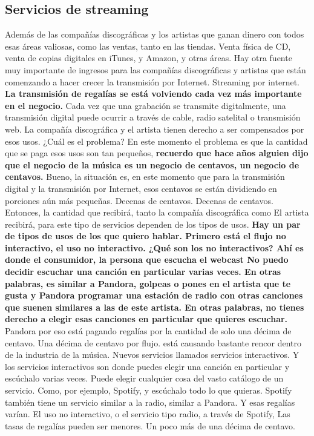 \documentclass[10pt]{book}
\begin{document}
\subsection{Servicios de streaming}
Además de las compañías discográficas y los artistas que ganan dinero con todos esas áreas valiosas, como las ventas, tanto en las tiendas. Venta física de CD, venta de copias digitales en iTunes, y Amazon, y otras áreas. Hay otra fuente muy importante de ingresos para las compañías discográficas y artistas que están comenzando a hacer crecer la transmisión por Internet. Streaming por internet. \textbf{La transmisión de regalías se está volviendo cada vez más importante en el negocio.} Cada vez que una grabación se transmite digitalmente, una transmisión digital puede ocurrir a través de cable, radio satelital o transmisión web. La compañía discográfica y el artista tienen derecho a ser compensados por esos usos. ¿Cuál es el problema? En este momento el problema es que la cantidad que se paga esos usos son tan pequeños, \textbf{recuerdo que hace años alguien dijo que el negocio de la música es un negocio de centavos, un negocio de centavos.} Bueno, la situación es, en este momento que para la transmisión digital y la transmisión por Internet, esos centavos se están dividiendo en porciones aún más pequeñas. Decenas de centavos. Decenas de centavos. Entonces, la cantidad que recibirá, tanto la compañía discográfica como El artista recibirá, para este tipo de servicios dependen de los tipos de usos. \textbf{Hay un par de tipos de usos de los que quiero hablar. Primero está el flujo no interactivo, el uso no interactivo. ¿Qué son los no interactivos? Ahí es donde el consumidor, la persona que escucha el webcast No puedo decidir escuchar una canción en particular varias veces. En otras palabras, es similar a Pandora, golpeas o pones en el artista que te gusta y Pandora programar una estación de radio con otras canciones que suenen similares a las de este artista. En otras palabras, no tienes derecho a elegir esas canciones en particular que quieres escuchar.} Pandora por eso está pagando regalías por la cantidad de solo una décima de centavo. Una décima de centavo por flujo. está causando bastante rencor dentro de la industria de la música. Nuevos servicios llamados servicios interactivos. Y los servicios interactivos son donde puedes elegir una canción en particular y escúchalo varias veces. Puede elegir cualquier cosa del vasto catálogo de un servicio. Como, por ejemplo, Spotify, y escúchalo todo lo que quieras. Spotify también tiene un servicio similar a la radio, similar a Pandora. Y esas regalías varían. El uso no interactivo, o el servicio tipo radio, a través de Spotify, Las tasas de regalías pueden ser menores. Un poco más de una décima de centavo.\\
\end{document}
